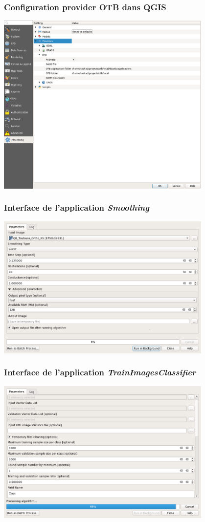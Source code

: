 \begin{frame}
\frametitle{Configuration provider OTB dans QGIS}
\begin{center}
\includegraphics[width=0.8\textwidth]{images/qgis_otb_provider_config.png}
\end{center} 
\end{frame}

\begin{frame}
\frametitle{Interface de l'application \textit{Smoothing}}
\begin{center}
\includegraphics[width=0.8\textwidth]{images/qgis_smoothing.png}
\end{center} 
\end{frame}

\begin{frame}
\frametitle{Interface de l'application \textit{TrainImagesClassifier}}
\begin{center}
\includegraphics[width=0.8\textwidth]{images/qgis_train_classif.png}
\end{center} 
\end{frame}
